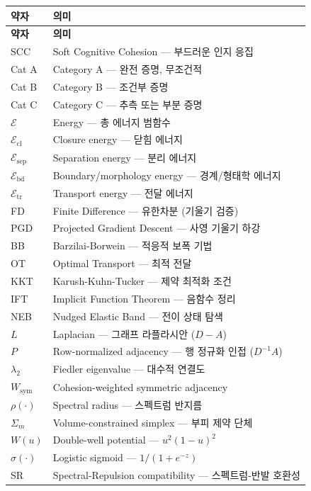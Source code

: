 \begin{longtable}{lp{11cm}}
\hline
\textbf{약자} & \textbf{의미} \\
\hline
\endfirsthead
\hline
\textbf{약자} & \textbf{의미} \\
\hline
\endhead
SCC & Soft Cognitive Cohesion --- 부드러운 인지 응집 \\
Cat A & Category A --- 완전 증명, 무조건적 \\
Cat B & Category B --- 조건부 증명 \\
Cat C & Category C --- 추측 또는 부분 증명 \\
\hline
$\mathcal{E}$ & Energy --- 총 에너지 범함수 \\
$\mathcal{E}_{\mathrm{cl}}$ & Closure energy --- 닫힘 에너지 \\
$\mathcal{E}_{\mathrm{sep}}$ & Separation energy --- 분리 에너지 \\
$\mathcal{E}_{\mathrm{bd}}$ & Boundary/morphology energy --- 경계/형태학 에너지 \\
$\mathcal{E}_{\mathrm{tr}}$ & Transport energy --- 전달 에너지 \\
\hline
FD & Finite Difference --- 유한차분 (기울기 검증) \\
PGD & Projected Gradient Descent --- 사영 기울기 하강 \\
BB & Barzilai-Borwein --- 적응적 보폭 기법 \\
OT & Optimal Transport --- 최적 전달 \\
KKT & Karush-Kuhn-Tucker --- 제약 최적화 조건 \\
IFT & Implicit Function Theorem --- 음함수 정리 \\
NEB & Nudged Elastic Band --- 전이 상태 탐색 \\
\hline
$L$ & Laplacian --- 그래프 라플라시안 ($D - A$) \\
$P$ & Row-normalized adjacency --- 행 정규화 인접 ($D^{-1}A$) \\
$\lambda_2$ & Fiedler eigenvalue --- 대수적 연결도 \\
$W_{\mathrm{sym}}$ & Cohesion-weighted symmetric adjacency \\
$\rho(\cdot)$ & Spectral radius --- 스펙트럼 반지름 \\
\hline
$\Sigma_m$ & Volume-constrained simplex --- 부피 제약 단체 \\
$W(u)$ & Double-well potential --- $u^2(1-u)^2$ \\
$\sigma(\cdot)$ & Logistic sigmoid --- $1/(1+e^{-z})$ \\
\hline
SR & Spectral-Repulsion compatibility --- 스펙트럼-반발 호환성 \\

\end{longtable}
